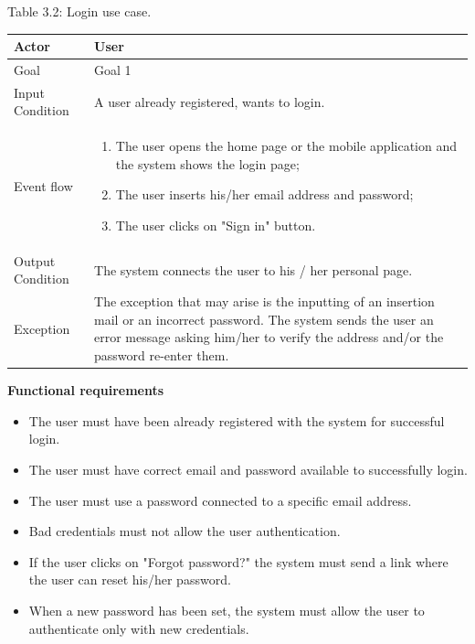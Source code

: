 \documentclass{article}
\begin{document}
	\begin{center}
		Table 3.2: Login use case.
		
		\bigskip
    		\begin{tabular}{p{}|p{}}
   			\hline
    			Actor & User \\ \hline
    			Goal & Goal 1 \\ \hline
    			Input Condition & A user already registered, wants to login. \\ \hline
    			Event flow & 
			\begin{enumerate}
  				\item The user opens the home page or the mobile application and the system shows the login page;
  				\item The user inserts his/her email address and password;
  				\item The user clicks on "Sign in" button.
 			\end{enumerate} \\ \hline
    			Output Condition & The system connects the user to his / her personal page. \\ \hline
    			Exception & The exception that may arise is the inputting of an insertion mail or an incorrect password. The system sends the user an error message asking him/her to verify the address and/or the password re-enter them. \\ \hline
    		\end{tabular}
	\end{center}
	
	\bigskip
	\noindent
	\textbf{Functional requirements} \\
	\begin{itemize}
		\item The user must have been already registered with the system for successful login.
		\item The user must have correct email and password available to successfully login.
		\item The user must use a password connected to a specific email address.
		\item Bad credentials must not allow the user authentication.
		\item If the user clicks on "Forgot password?" the system must send a link where the user can reset his/her password.
		\item When a new password has been set, the system must allow the user to authenticate only with new credentials.
	\end{itemize}
	
\end{document}
